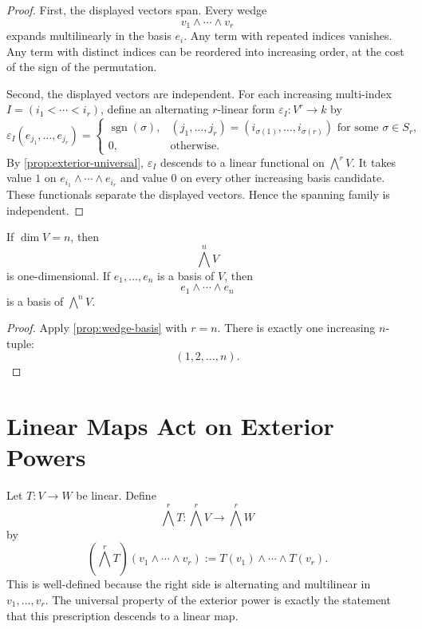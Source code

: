 \documentclass[11pt]{memoir}
\providecommand{\Cref}[1]{\ref{#1}}
\begin{document}
\begin{proof}
First, the displayed vectors span. Every wedge
\[
  v_1\wedge\cdots\wedge v_r
\]
expands multilinearly in the basis \(e_i\). Any term with repeated
indices vanishes. Any term with distinct indices can be reordered
into increasing order, at the cost of the sign of the permutation.

Second, the displayed vectors are independent. For each increasing
multi-index \(I=(i_1<\cdots<i_r)\), define an alternating \(r\)-linear
form \(\varepsilon_I:V^r\to k\) by
\[
  \varepsilon_I(e_{j_1},\dots,e_{j_r})
  =
  \begin{cases}
    \operatorname{sgn}(\sigma),&
    (j_1,\dots,j_r)=(i_{\sigma(1)},\dots,i_{\sigma(r)})
    \text{ for some }\sigma\in S_r,\\
    0,&\text{otherwise.}
  \end{cases}
\]
By \Cref{prop:exterior-universal}, \(\varepsilon_I\) descends to a
linear functional on \(\bigwedge^rV\). It takes value \(1\) on
\(e_{i_1}\wedge\cdots\wedge e_{i_r}\) and value \(0\) on every other
increasing basis candidate. These functionals separate the displayed
vectors. Hence the spanning family is independent.
\end{proof}

\begin{corollary}
\label{cor:top-wedge-line}
If \(\dim V=n\), then
\[
  \bigwedge^nV
\]
is one-dimensional. If \(e_1,\dots,e_n\) is a basis of \(V\), then
\[
  e_1\wedge\cdots\wedge e_n
\]
is a basis of \(\bigwedge^nV\).
\end{corollary}

\begin{proof}
Apply \Cref{prop:wedge-basis} with \(r=n\). There is exactly one
increasing \(n\)-tuple:
\[
  (1,2,\dots,n).
\]
\end{proof}

\section{Linear Maps Act on Exterior Powers}
\label{sec:linear-maps-exterior}

Let \(T:V\to W\) be linear. Define
\[
  \bigwedge^rT:\bigwedge^rV\to\bigwedge^rW
\]
by
\[
  (\bigwedge^rT)(v_1\wedge\cdots\wedge v_r)
  :=
  T(v_1)\wedge\cdots\wedge T(v_r).
\]
This is well-defined because the right side is alternating and
multilinear in \(v_1,\dots,v_r\). The universal property of the
exterior power is exactly the statement that this prescription
descends to a linear map.
\end{document}

